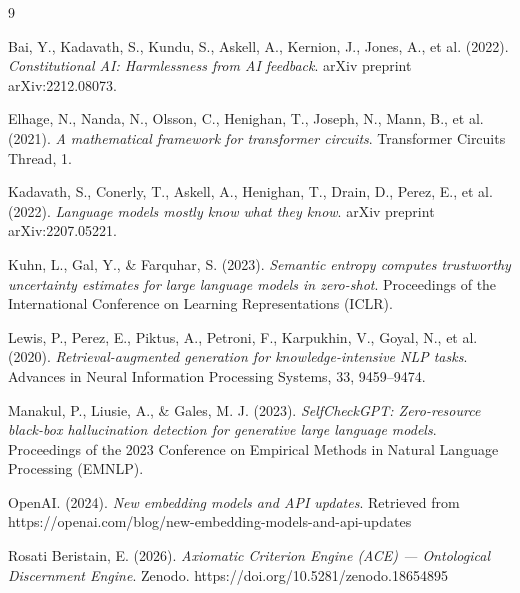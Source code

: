 \documentclass[11pt]{article}
\begin{document}
\begin{thebibliography}{9}

Bai, Y., Kadavath, S., Kundu, S., Askell, A., Kernion, J., Jones, A., et al. (2022).
\textit{Constitutional AI: Harmlessness from AI feedback}.
arXiv preprint arXiv:2212.08073.

Elhage, N., Nanda, N., Olsson, C., Henighan, T., Joseph, N., Mann, B., et al. (2021).
\textit{A mathematical framework for transformer circuits}.
Transformer Circuits Thread, 1.

Kadavath, S., Conerly, T., Askell, A., Henighan, T., Drain, D., Perez, E., et al. (2022).
\textit{Language models mostly know what they know}.
arXiv preprint arXiv:2207.05221.

Kuhn, L., Gal, Y., & Farquhar, S. (2023).
\textit{Semantic entropy computes trustworthy uncertainty estimates for large language models in zero-shot}.
Proceedings of the International Conference on Learning Representations (ICLR).

Lewis, P., Perez, E., Piktus, A., Petroni, F., Karpukhin, V., Goyal, N., et al. (2020).
\textit{Retrieval-augmented generation for knowledge-intensive NLP tasks}.
Advances in Neural Information Processing Systems, 33, 9459--9474.

Manakul, P., Liusie, A., & Gales, M. J. (2023).
\textit{SelfCheckGPT: Zero-resource black-box hallucination detection for generative large language models}.
Proceedings of the 2023 Conference on Empirical Methods in Natural Language Processing (EMNLP).

OpenAI. (2024).
\textit{New embedding models and API updates}.
Retrieved from https://openai.com/blog/new-embedding-models-and-api-updates

Rosati Beristain, E. (2026).
\textit{Axiomatic Criterion Engine (ACE) --- Ontological Discernment Engine}.
Zenodo.
https://doi.org/10.5281/zenodo.18654895

\end{thebibliography}
\end{document}
